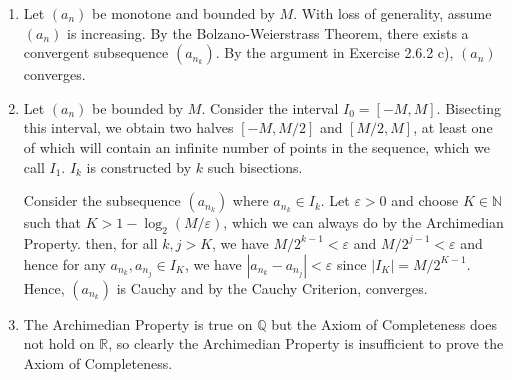 \documentclass[a4paper]{report}
\newenvironment{ex}[1]
    {\noindent{\large \bf Exercise #1.}}{\vspace{0.5cm}}
\begin{document}
\begin{ex}{2.6.7}
  \begin{enumerate}[label=\alph*)]
  \item Let $(a_n)$ be monotone and bounded by $M$. With loss of generality, assume $(a_n)$ is increasing. By the
    Bolzano-Weierstrass Theorem, there exists a convergent subsequence $(a_{n_k})$. By the argument in
    Exercise 2.6.2 c), $(a_n)$ converges.
  \item Let $(a_n)$ be bounded by $M$. Consider the interval $I_0 = [-M, M]$. Bisecting this interval,
    we obtain two halves $[-M, M/2]$ and $[M/2, M]$, at least one of which will contain an infinite number of points
    in the sequence, which we call $I_1$. $I_k$ is constructed by $k$ such bisections.

    Consider the subsequence $(a_{n_k})$ where $a_{n_k} \in I_k$. Let
    $\varepsilon > 0$ and choose $K \in \mathbb{N}$ such that $K >
    1 -\log_2 (M/\varepsilon)$, which we can always do by the
    Archimedian Property.  then, for all $k, j > K$, we have $M/2^{k-1}
    < \varepsilon$ and $M/2^{j-1} < \varepsilon$ and hence for any
    $a_{n_k}, a_{n_j} \in I_K$, we have $|a_{n_k} - a_{n_j}| < \varepsilon$ since
    $|I_K| = M/2^{K-1}$. Hence, $(a_{n_k})$ is Cauchy and by the Cauchy Criterion, converges.

  \item The Archimedian Property is true on $\mathbb{Q}$ but the Axiom of Completeness does not hold on
    $\mathbb{R}$, so clearly the Archimedian Property is insufficient to prove the Axiom of Completeness.
  \end{enumerate}
\end{ex}
\end{document}
